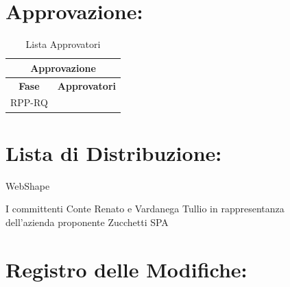   
\section*{\LARGE Approvazione:}
\begin{table}[!h]
  \begin{center}
    \begin{tabular}
      {|c|c|}
      \hline
      \multicolumn{2}{|c|}{ \textbf{Approvazione} } \\
      \hline
      \textbf{Fase} & \textbf{Approvatori} \\
      \hline
      \multirow{1}{*}{RPP-RQ} & \\
                  
      \hline
    \end{tabular}
    \caption{Lista Approvatori} %
    \label{tabapprovazione}
  \end{center}
\end{table}
 
\textbf{}
\newpage
\section*{\LARGE Lista di Distribuzione:}
 
  \begin{elenconumerato}{\normindent}
    \item WebShape
    \item I committenti Conte Renato e Vardanega Tullio in rappresentanza \\ dell'azienda proponente Zucchetti SPA
  \end{elenconumerato}
 
 
 
 
\section*{\Large Registro delle Modifiche:}
 
